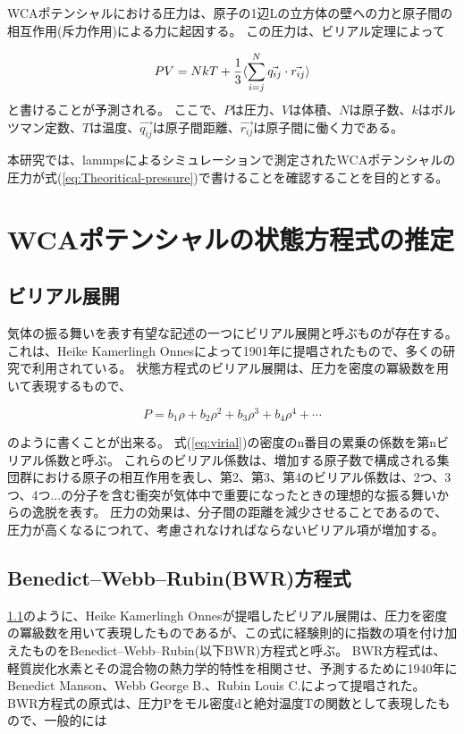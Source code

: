 \documentclass[titlepage]{jsreport}
\begin{document}
WCAポテンシャルにおける圧力は、原子の1辺Lの立方体の壁への力と原子間の相互作用(斥力作用)による力に起因する。
この圧力は、ビリアル定理\cite{virial-therom}によって

\large
\begin{equation}
PV=NkT+{\frac{1}{3}}\langle\sum_{i=j}^N\vec{q_{ij}} \cdot \vec{r_{ij}}\rangle{\label{eq:Theoritical-pressure}}
\end{equation}
\normalsize
と書ける\cite{Theoritical-pressure}ことが予測される。
ここで、$P$は圧力、$V$は体積、$N$は原子数、$k$はボルツマン定数、$T$は温度、$\vec{q_{ij}}$は原子間距離、$\vec{r_{ij}}$は原子間に働く力である。

本研究では、lammpsによるシミュレーションで測定されたWCAポテンシャルの圧力が式(\ref{eq:Theoritical-pressure})で書けることを確認することを目的とする。



\section{WCAポテンシャルの状態方程式の推定}\label{method-sec:WCA-equation}
\subsection{ビリアル展開}\label{method-subsec:virial}
気体の振る舞いを表す有望な記述の一つにビリアル展開と呼ぶものが存在する。
これは、Heike Kamerlingh Onnesによって1901年に提唱されたもの\cite{virial-Heike}で、多くの研究で利用されている。
状態方程式のビリアル展開は、圧力を密度の冪級数を用いて表現するもので、

\large
\begin{equation}
P=b_1{\rho}+b_2{\rho}^2+b_3{\rho}^3+b_4{\rho}^4+\cdots \label{eq:virial}
\end{equation}

\normalsize
のように書くことが出来る。
式(\ref{eq:virial})の密度のn番目の累乗の係数を第nビリアル係数と呼ぶ\cite{virial-expansion}。
これらのビリアル係数は、増加する原子数で構成される集団群における原子の相互作用を表し、第2、第3、第4のビリアル係数は、2つ、3つ、4つ...の分子を含む衝突が気体中で重要になったときの理想的な振る舞いからの逸脱を表す。
圧力の効果は、分子間の距離を減少させることであるので、圧力が高くなるにつれて、考慮されなければならないビリアル項が増加する\cite{virial-Heike}。

\subsection{Benedict–Webb–Rubin(BWR)方程式}\label{method-subsec:BWR}
\ref{method-subsec:virial}のように、Heike Kamerlingh Onnesが提唱したビリアル展開は、圧力を密度の冪級数を用いて表現したものであるが、この式に経験則的に指数の項を付け加えたものをBenedict–Webb–Rubin(以下BWR)方程式と呼ぶ。
BWR方程式は、軽質炭化水素とその混合物の熱力学的特性を相関させ、予測するために1940年にBenedict Manson、Webb George B.、Rubin Louis C.によって提唱された\cite{BWR-equation:original}。
BWR方程式の原式は、圧力Pをモル密度dと絶対温度Tの関数として表現したもので、一般的には
\end{document}
